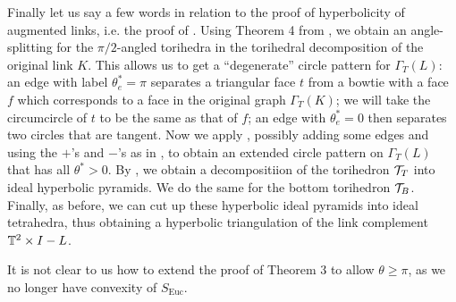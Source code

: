 Finally let us say a few words in relation to the proof of hyperbolicity
of augmented links, i.e. the proof of
.
Using Theorem 4 from \cite{BandS},
we obtain an angle-splitting for the $\pi/2$-angled
torihedra in the torihedral decomposition
of the original link $K$.
This allows us to get a ``degenerate'' circle pattern
for $\Gamma_T(L)$:
an edge with label $\theta_e^* = \pi$
separates a triangular face $t$ from a bowtie with a face $f$
which corresponds to a face in the original graph $\Gamma_T(K)$;
we will take the circumcircle of $t$ to be the same
as that of $f$;
an edge with $\theta_e^* = 0$
then separates two circles that are tangent.
Now we apply ,
possibly adding some edges and
using the $+$'s and $-$'s as in ,
to obtain an extended circle pattern on $\Gamma_T(L)$
that has all $\theta^* > 0$.
By ,
we obtain a decompositiion of the torihedron ${\mathcal{T}}_T$
into ideal hyperbolic pyramids.
We do the same for the bottom torihedron ${\mathcal{T}}_B$.
Finally, as before, we can cut up these hyperbolic ideal pyramids
into ideal tetrahedra,
thus obtaining a hyperbolic triangulation of the link complement
${{\mathbb{T}^2} \times I - L}$.


\begin{remark}
It is not clear to us how to extend the proof of
Theorem 3 \cite{BandS} to allow $\theta \geq \pi$,
as we no longer have convexity of $S_{\text{Euc}}$.
\end{remark}

